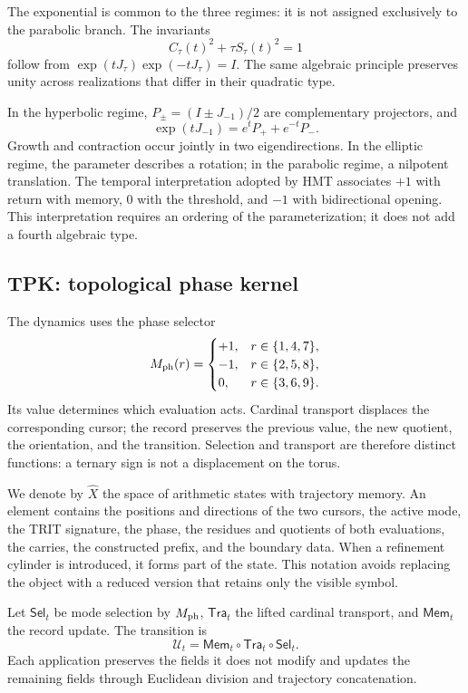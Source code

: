 The exponential is common to the three regimes: it is not assigned exclusively to the parabolic branch. The invariants
\[
 C_\tau(t)^2+\tau S_\tau(t)^2=1
\]
follow from \(\exp(tJ_\tau)\exp(-tJ_\tau)=I\). The same algebraic principle preserves unity across realizations that differ in their quadratic type.

In the hyperbolic regime, \(P_\pm=(I\pm J_{-1})/2\) are complementary projectors, and
\[
 \exp(tJ_{-1})=e^tP_++e^{-t}P_-.
\]
Growth and contraction occur jointly in two eigendirections. In the elliptic regime, the parameter describes a rotation; in the parabolic regime, a nilpotent translation. The temporal interpretation adopted by HMT associates \(+1\) with return with memory, \(0\) with the threshold, and \(-1\) with bidirectional opening. This interpretation requires an ordering of the parameterization; it does not add a fourth algebraic type.





\newpage
\subsection{TPK: topological phase kernel}

The dynamics uses the phase selector
\[
 M_{\rm ph}(r)=
 \begin{cases}
 +1,&r\in\{1,4,7\},\\
 -1,&r\in\{2,5,8\},\\
 0,&r\in\{3,6,9\}.
 \end{cases}
\]
Its value determines which evaluation acts. Cardinal transport displaces the corresponding cursor; the record preserves the previous value, the new quotient, the orientation, and the transition. Selection and transport are therefore distinct functions: a ternary sign is not a displacement on the torus.

We denote by \(\widehat X\) the space of arithmetic states with trajectory memory. An element contains the positions and directions of the two cursors, the active mode, the TRIT signature, the phase, the residues and quotients of both evaluations, the carries, the constructed prefix, and the boundary data. When a refinement cylinder is introduced, it forms part of the state. This notation avoids replacing the object with a reduced version that retains only the visible symbol.

\begin{definition}
Let \(\mathsf{Sel}_t\) be mode selection by \(M_{\rm ph}\), \(\mathsf{Tra}_t\) the lifted cardinal transport, and \(\mathsf{Mem}_t\) the record update. The transition is
\begin{equation}
 \mathcal U_t=\mathsf{Mem}_t\circ\mathsf{Tra}_t\circ\mathsf{Sel}_t.
 \label{eq:actualizacion}
\end{equation}
Each application preserves the fields it does not modify and updates the remaining fields through Euclidean division and trajectory concatenation.
\end{definition}

